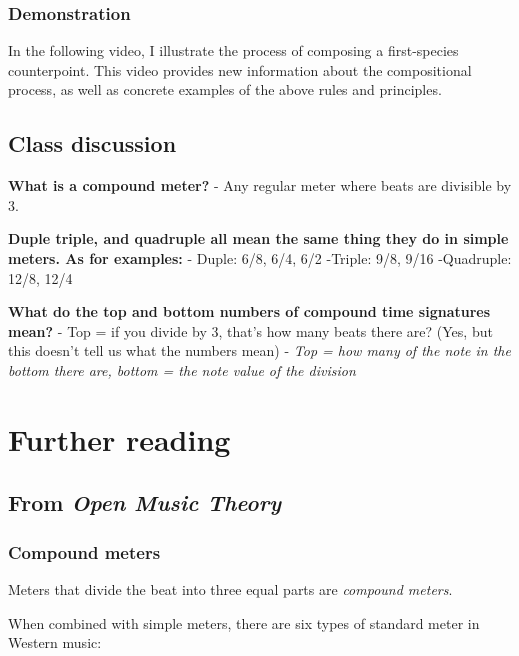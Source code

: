 \documentclass{book}
\begin{document}
\hypertarget{demonstration}{%
\subsection{Demonstration}\label{demonstration}}

In the following video, I illustrate the process of composing a first-species
counterpoint. This video provides new information about the compositional
process, as well as concrete examples of the above rules and principles.

\hypertarget{class-discussion-30}{%
\section{Class discussion}\label{class-discussion-30}}

\textbf{What is a compound meter?} - Any regular meter where beats are
divisible by 3.

\textbf{Duple triple, and quadruple all mean the same thing they do in simple
meters. As for examples:} - Duple: 6/8, 6/4, 6/2 -Triple: 9/8, 9/16
-Quadruple: 12/8, 12/4

\textbf{What do the top and bottom numbers of compound time signatures mean?}
- Top = if you divide by 3, that's how many beats there are? (Yes, but this
doesn't tell us what the numbers mean) - \emph{Top = how many of the note in
the bottom there are, bottom = the note value of the division}

\hypertarget{further-reading-17}{%
\chapter{Further reading}\label{further-reading-17}}

\hypertarget{from-open-music-theory-17}{%
\section{\texorpdfstring{From \emph{Open Music
Theory}}{From Open Music Theory}}\label{from-open-music-theory-17}}

\hypertarget{compound-meters}{%
\subsection{Compound meters}\label{compound-meters}}

Meters that divide the beat into three equal parts are \emph{compound meters}.

When combined with simple meters, there are six types of standard meter in
Western music:
\end{document}
